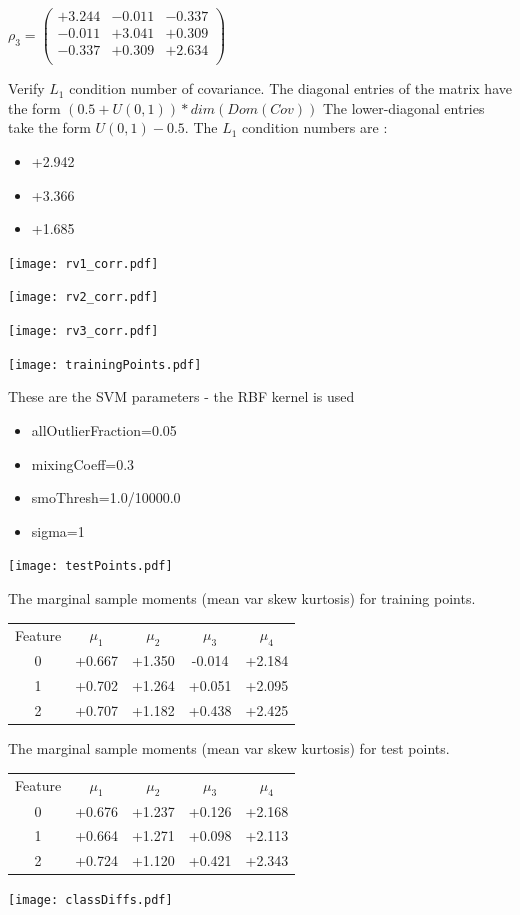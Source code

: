 \documentclass[12pt]{article}
\theoremstyle{definition}
\theoremstyle{remark}
\numberwithin{equation}{section}
\begin{document}
$\rho_3 = \left(
\begin{array}{
ccc}
+3.244 & -0.011 & -0.337 \\
-0.011 & +3.041 & +0.309 \\
-0.337 & +0.309 & +2.634 \\
\end{array}
\right)$

Verify $L_1$ condition number of covariance. The diagonal entries of the matrix have the form $(0.5 + U(0,1) )*dim(Dom(Cov))$
The lower-diagonal entries take the form $U(0,1) - 0.5$. 
The $L_1$ condition numbers are :
\begin{itemize}
\item +2.942
\item +3.366
\item +1.685
\end{itemize}
\texttt{[image: rv1\_corr.pdf]}

\texttt{[image: rv2\_corr.pdf]}

\texttt{[image: rv3\_corr.pdf]}

\texttt{[image: trainingPoints.pdf]}

These are the SVM parameters - the RBF kernel is used\begin{itemize}
\item allOutlierFraction=0.05
\item mixingCoeff=0.3
\item smoThresh=1.0/10000.0
\item sigma=1
\end{itemize}
\texttt{[image: testPoints.pdf]}

The marginal sample moments (mean var skew kurtosis) for training points.\newline
\begin{tabular}{ c |  c  c  c  c}
Feature & $\mu_1$ & $\mu_2$ & $\mu_3$ & $\mu_4$ \\
0 & +0.667 & +1.350 & -0.014& +2.184 \\
\hline
1 & +0.702 & +1.264 & +0.051& +2.095 \\
\hline
2 & +0.707 & +1.182 & +0.438& +2.425 \\
\hline
\end{tabular}
\newline
The marginal sample moments (mean var skew kurtosis) for test points.\newline
\begin{tabular}{ c | c  c  c  c}
Feature & $\mu_1$ & $\mu_2$ & $\mu_3$ & $\mu_4$ \\
0 & +0.676 & +1.237 & +0.126& +2.168\\
\hline
1 & +0.664 & +1.271 & +0.098& +2.113\\
\hline
2 & +0.724 & +1.120 & +0.421& +2.343\\
\hline
\end{tabular}\newline
\texttt{[image: classDiffs.pdf]}
\end{document}
